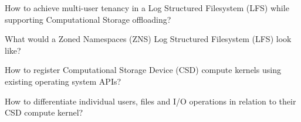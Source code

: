 \documentclass[conference]{IEEEtran}
\newcommand\bashstyle{
	\lstset{
		language=Bash,
		basicstyle=\ttm,
		showstringspaces=false,
		tabsize=2,
		aboveskip=0.2cm,
		belowskip=0.2cm,
		prebreak=\textbackslash,
		extendedchars=true,
		mathescape=false,
		linewidth=8.85cm,
		breaklines=true
	}
}
\newcommand\bashexternal[2][]{{\bashstyle}}
\begin{document}
How to achieve multi-user tenancy in a Log Structured Filesystem (LFS) while
supporting Computational Storage offloading?

What would a Zoned Namespaces (ZNS) Log Structured Filesystem (LFS) look like?

How to register Computational Storage Device (CSD) compute kernels using
existing operating system APIs?

How to differentiate individual users, files and I/O operations in relation to
their CSD compute kernel?



\end{document}
